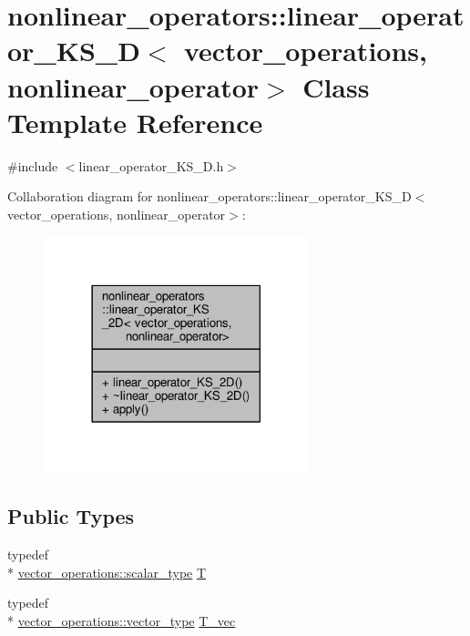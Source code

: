 \hypertarget{classnonlinear__operators_1_1linear__operator__KS__2D}{\section{nonlinear\-\_\-operators\-:\-:linear\-\_\-operator\-\_\-\-K\-S\-\_\-D$<$ vector\-\_\-operations, nonlinear\-\_\-operator$>$ Class Template Reference}
\label{classnonlinear__operators_1_1linear__operator__KS__2D}
}


{\ttfamily \#include $<$linear\-\_\-operator\-\_\-\-K\-S\-\_\-D.\-h$>$}



Collaboration diagram for nonlinear\-\_\-operators\-:\-:linear\-\_\-operator\-\_\-\-K\-S\-\_\-D$<$ vector\-\_\-operations, nonlinear\-\_\-operator$>$\-:\nopagebreak
\begin{figure}[H]
\begin{center}
\leavevmode
\includegraphics[width=218pt]{classnonlinear__operators_1_1linear__operator__KS__2D__coll__graph}
\end{center}
\end{figure}
\subsection*{Public Types}
\begin{DoxyCompactItemize}
\item 
typedef \\*
\hyperlink{structcpu__vector__operations_aca6b216aa1fb172df83d98350e94fd61}{vector\-\_\-operations\-::scalar\-\_\-type} \hyperlink{classnonlinear__operators_1_1linear__operator__KS__2D_ab5ed31d39991f15dc88ef56cd373c84d}{T}
\item 
typedef \\*
\hyperlink{structcpu__vector__operations_a1962836df596ce262704d208e9a6d8f9}{vector\-\_\-operations\-::vector\-\_\-type} \hyperlink{classnonlinear__operators_1_1linear__operator__KS__2D_af68ec3eba6ca7f10f49f64b20a7259a1}{T\-\_\-vec}
\end{DoxyCompactItemize}
